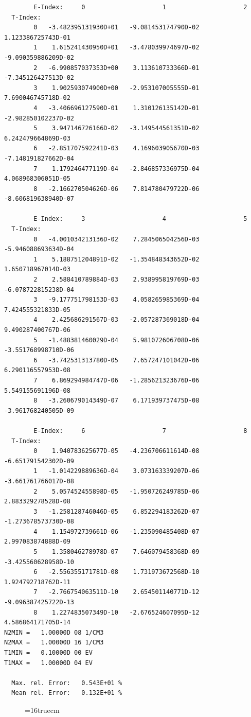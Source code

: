\documentclass[12pt,dvipdfmx]{article}
\begin{document}
\begin{small}\begin{verbatim}
        E-Index:     0                     1                     2
  T-Index:
        0   -3.482395131930D+01   -9.081453174790D-02    1.123386725743D-01
        1    1.615241430950D+01   -3.478039974697D-02   -9.090359886209D-02
        2   -6.990857037353D+00    3.113610733366D-01   -7.345126427513D-02
        3    1.902593074900D+00   -2.953107005555D-01    7.690046745718D-02
        4   -3.406696127590D-01    1.310126135142D-01   -2.982850102237D-02
        5    3.947146726166D-02   -3.149544561351D-02    6.242479664869D-03
        6   -2.851707592241D-03    4.169603905670D-03   -7.148191827662D-04
        7    1.179246477119D-04   -2.846857336975D-04    4.068968306051D-05
        8   -2.166270504626D-06    7.814780479722D-06   -8.606819638940D-07

        E-Index:     3                     4                     5
  T-Index:
        0   -4.001034213136D-02    7.284506504256D-03   -5.946088693634D-04
        1    5.188751204891D-02   -1.354848343652D-02    1.650718967014D-03
        2    2.588410789884D-03    2.938995819769D-03   -6.078722815238D-04
        3   -9.177751798153D-03    4.058265985369D-04    7.424555321833D-05
        4    2.425686291567D-03   -2.057287369018D-04    9.490287400767D-06
        5   -1.488381460029D-04    5.981072606708D-06   -3.551768998710D-06
        6   -3.742531313780D-05    7.657247101042D-06    6.290116557953D-08
        7    6.869294984747D-06   -1.285621323676D-06    5.549155691196D-08
        8   -3.260679014349D-07    6.171939737475D-08   -3.961768240505D-09

        E-Index:     6                     7                     8
  T-Index:
        0    1.940783625677D-05   -4.236706611614D-08   -6.651791542302D-09
        1   -1.014229889636D-04    3.073163339207D-06   -3.661761766017D-08
        2    5.057452455898D-05   -1.950726249785D-06    2.883329278528D-08
        3   -1.258128746046D-05    6.852294183262D-07   -1.273678573730D-08
        4    1.154972739661D-06   -1.235090485408D-07    2.997083874888D-09
        5    1.358046278978D-07    7.646079458368D-09   -3.425560628958D-10
        6   -2.556355171781D-08    1.731973672568D-10    1.924792718762D-11
        7   -2.766754063511D-10    2.654501140771D-12   -9.096387425722D-13
        8    1.227483507349D-10   -2.676524607095D-12    4.586864171705D-14
N2MIN =   1.00000D 08 1/CM3
N2MAX =   1.00000D 16 1/CM3
T1MIN =   0.10000D 00 EV
T1MAX =   1.00000D 04 EV

  Max. rel. Error:   0.543E+01 %
  Mean rel. Error:   0.132E+01 %

\end{verbatim}\end{small}
\begin{figure} \label{2.2.9g}
\epsfxsize=16truecm
\end{figure}
\newpage
\end{document}
